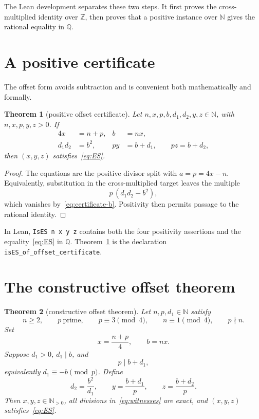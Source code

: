 \documentclass[11pt]{article}
\newtheorem{theorem}{Theorem}[section]
\theoremstyle{remark}
\newcommand{\N}{\mathbb{N}}
\newcommand{\Q}{\mathbb{Q}}
\newcommand{\Z}{\mathbb{Z}}
\begin{document}
The Lean development separates these two steps.  It first proves the
cross-multiplied identity over \(\Z\), then proves that a positive instance over
\(\N\) gives the rational equality in \(\Q\).

\section{A positive certificate}

The offset form avoids subtraction and is convenient both mathematically and
formally.

\begin{theorem}[positive offset certificate]\label{thm:certificate}
Let \(n,x,p,b,d_1,d_2,y,z\in\N\), with \(n,x,p,y,z>0\).  If
\begin{align}
  4x &= n+p,                 & b &= nx, \label{eq:certificate-a}\\
  d_1d_2 &= b^2,             & py &= b+d_1,\qquad pz=b+d_2, \label{eq:certificate-b}
\end{align}
then \((x,y,z)\) satisfies~\eqref{eq:ES}.
\end{theorem}

\begin{proof}
The equations are the positive divisor split with \(a=p=4x-n\).  Equivalently,
substitution in the cross-multiplied target leaves the multiple
\[
  p\,(d_1d_2-b^2),
\]
which vanishes by~\eqref{eq:certificate-b}.  Positivity then permits passage to
the rational identity.
\end{proof}

In Lean, \texttt{IsES n x y z} contains both the four positivity assertions and
the equality~\eqref{eq:ES} in \(\Q\).  Theorem~\ref{thm:certificate} is the
declaration \texttt{isES\_of\_offset\_certificate}.

\section{The constructive offset theorem}

\begin{theorem}[constructive offset theorem]\label{thm:offset}
Let \(n,p,d_1\in\N\) satisfy
\[
  n\ge2,\qquad p\ \text{prime},\qquad
  p\equiv3\pmod4,\qquad n\equiv1\pmod4,\qquad p\nmid n.
\]
Set
\[
  x=\frac{n+p}{4},\qquad b=nx.
\]
Suppose \(d_1>0\), \(d_1\mid b\), and
\begin{equation}\label{eq:first-congruence}
  p\mid b+d_1,
\end{equation}
equivalently \(d_1\equiv-b\pmod p\).  Define
\begin{equation}\label{eq:witnesses}
  d_2=\frac{b^2}{d_1},\qquad
  y=\frac{b+d_1}{p},\qquad
  z=\frac{b+d_2}{p}.
\end{equation}
Then \(x,y,z\in\N_{>0}\), all divisions in~\eqref{eq:witnesses} are exact, and
\((x,y,z)\) satisfies~\eqref{eq:ES}.
\end{theorem}
\end{document}
